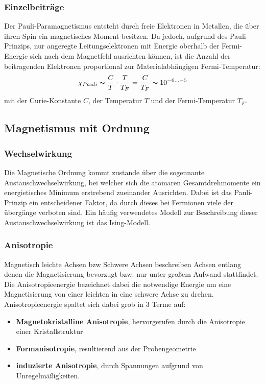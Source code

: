             \subsubsection*{Einzelbeiträge}
            Der Pauli-Paramagnetismus entsteht durch freie Elektronen in Metallen, die über ihren Spin
            ein magnetisches Moment besitzen. Da jedoch, aufgrund des Pauli-Prinzips, nur angeregte
            Leitungselektronen mit Energie oberhalb der Fermi-Energie sich nach dem Magnetfeld ausrichten können,
            ist die Anzahl der beitragenden Elektronen proportional zur Materialabhängigen Fermi-Temperatur:
            \begin{equation}
                \chi_{Pauli} \thicksim \frac{C}{T} \cdot \frac{T}{T_{F}} = \frac{C}{T_F}\thicksim 10^{-6 ... -5}
            \end{equation}
            mit der Curie-Konstante $C$, der Temperatur $T$ und der Fermi-Temperatur $T_F$.


    \subsection{Magnetismus mit Ordnung}
        \subsubsection*{Wechselwirkung}
            Die Magnetische Ordnung kommt zustande über die sogennante Austauschwechselwirkung, bei welcher sich
            die atomaren Gesamtdrehmomente ein energietisches Minimum erstrebend zueinander Ausrichten. Dabei ist
            das Pauli-Prinzip ein entscheidener Faktor, da durch dieses bei Fermionen viele der übergänge verboten sind.
            Ein häufig verwendetes Modell zur Beschreibung dieser Austauschwechselwirkung ist das Ising-Modell.
        \subsubsection*{Anisotropie}
            Magnetisch leichte Achsen bzw Schwere Achsen beschreiben Achsen entlang denen die Magnetisierung bevorzugt
            bzw. nur unter großem Aufwand stattfindet. Die Anisotropieenergie bezeichnet dabei die notwendige Energie
            um eine Magnetisierung von einer leichten in eine schwere Achse zu drehen.\\
            Anisotropieenergie spaltet sich dabei grob in 3 Terme auf:
            \begin{itemize}
                \item \textbf{Magnetokristalline Anisotropie}, hervorgerufen durch die Anisotropie einer Kristallstruktur
                \item \textbf{Formanisotropie}, resultierend aus der Probengeometrie
                \item \textbf{induzierte Anisotropie}, durch Spannungen aufgrund von Unregelmäßigkeiten.
            \end{itemize}
